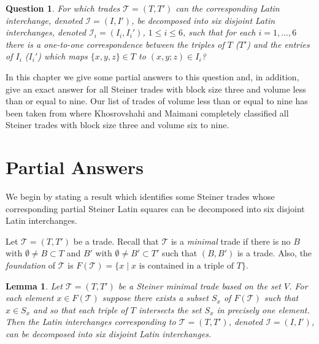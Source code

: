 \documentclass[12pt]{report}
\newtheorem{lemma}{Lemma}
\newtheorem{question}{Question}
\begin{document}
\begin{question}\label{714}
{
For which trades ${\mathcal T}=(T,T')$ can the corresponding 
Latin interchange, denoted ${\mathcal I}=(I,I')$, be decomposed into six disjoint 
Latin interchanges, denoted ${\mathcal I}_i=(I_i,I_i')$,  $1\leq i\leq 6$, 
such that for each $i=1,\dots, 6$ there is a one-to-one correspondence 
between the  triples of $T$ ($T'$) and the entries of $I_i$ ($I_i'$)
which maps $\{x,y,z\}\in T$ to $(x,y;z)\in I_i$?
}
\end{question}

In this chapter we give some partial answers to this question and, in addition, 
give an exact answer for all  Steiner trades with block size three and  
volume less than or equal to nine. 
Our list of trades of volume less than or equal to nine has been taken 
from \cite{MR2000g:05030} where Khosrovshahi and Maimani completely classified 
all Steiner trades with block size three and volume six to  nine.  

\section{Partial Answers}\label{sec72}
We begin by stating a result which identifies some Steiner trades 
whose corresponding partial Steiner  Latin squares 
can be decomposed into six disjoint 
Latin interchanges.

Let ${\mathcal T}=(T,T')$ be a trade. Recall that ${\mathcal T}$ is a
{\it minimal} trade if there is no $B$ with $\emptyset\neq B\subset T$ and
$B'$ with $\emptyset\neq B'\subset T'$ such that $(B,B')$
is a trade.  Also, the {\em foundation} of ${\mathcal T}$ is $F({\mathcal
T})=\{x\mid x \mbox{ is contained in a triple of } T\}$.

\begin{lemma}
\label{lemone}
Let ${\mathcal T}=(T,T')$ be a Steiner minimal trade based on the set $V$. 
For each element $x\in F({\mathcal T})$ suppose there exists a subset 
$S_x$ of $F({\mathcal T})$ such that $x\in S_x$ and so that each triple of 
$T$ intersects the set $S_x$ in precisely one element. 
Then the Latin interchanges corresponding  to ${\mathcal T}=(T,T')$,
denoted ${\mathcal I}=(I,I')$,  can be decomposed into six disjoint 
Latin interchanges. 
\end{lemma}
\end{document}

